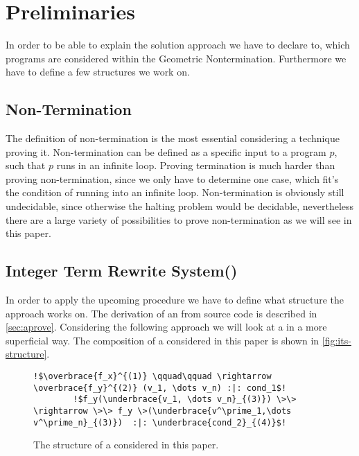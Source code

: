 \chapter{Preliminaries}
\label{chapter:preliminaries}

In order to be able to explain the solution approach we have to declare to, which programs are considered within the Geometric Nontermination. Furthermore we have to define a few structures we work on.

\section{Non-Termination}
The definition of non-termination is the most essential considering a technique proving it. Non-termination can be defined as a specific input to a program $p$, such that $p$ runs in an infinite loop.
Proving termination is much harder than proving non-termination, since we only have to determine one case, which fit's the condition of running into an infinite loop. \newline
Non-termination is obviously still undecidable, since otherwise the halting problem would be decidable, nevertheless there are a large variety of possibilities to prove non-termination as we will see in this paper.

\section{Integer Term Rewrite System(\its)}
\label{sec:its}
In order to apply the upcoming procedure we have to define what structure the approach works on. The derivation of an \its from source code is described in \autoref{sec:aprove}. Considering the following approach we will look at a \its in a more superficial way. The composition of a \its considered in this paper is shown in \autoref{fig:its-structure}.\newline
\begin{figure}[H]
	\begin{lstlisting}[escapechar=!]
		!$\overbrace{f_x}^{(1)} \qquad\qquad \rightarrow \overbrace{f_y}^{(2)} (v_1, \dots v_n) :|: cond_1$!
		!$f_y(\underbrace{v_1, \dots v_n}_{(3)}) \>\> \rightarrow \>\> f_y \>(\underbrace{v^\prime_1,\dots v^\prime_n}_{(3)})  :|: \underbrace{cond_2}_{(4)}$!
	\end{lstlisting}
	\caption{The structure of a \its considered in this paper.}
	\label{fig:its-structure}
\end{figure}

